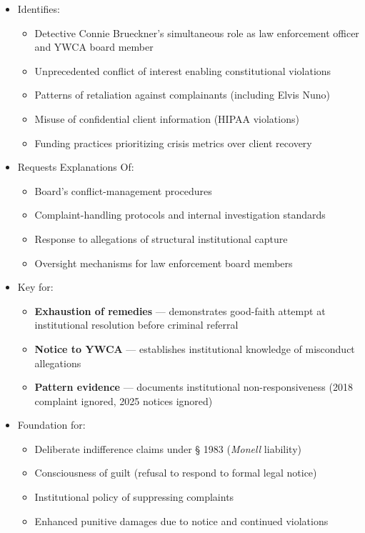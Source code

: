 \documentclass[11pt, letterpaper]{article}
\begin{document}
\begin{itemize}[leftmargin=*]
  \item Identifies:
    \begin{itemize}
      \item Detective Connie Brueckner's simultaneous role as law enforcement officer and YWCA board member
      \item Unprecedented conflict of interest enabling constitutional violations
      \item Patterns of retaliation against complainants (including Elvis Nuno)
      \item Misuse of confidential client information (HIPAA violations)
      \item Funding practices prioritizing crisis metrics over client recovery
    \end{itemize}
  \item Requests Explanations Of:
    \begin{itemize}
      \item Board's conflict-management procedures
      \item Complaint-handling protocols and internal investigation standards
      \item Response to allegations of structural institutional capture
      \item Oversight mechanisms for law enforcement board members
    \end{itemize}
  \item Key for:
    \begin{itemize}
      \item \textbf{Exhaustion of remedies} --- demonstrates good-faith attempt at institutional resolution before criminal referral
      \item \textbf{Notice to YWCA} --- establishes institutional knowledge of misconduct allegations
      \item \textbf{Pattern evidence} --- documents institutional non-responsiveness (2018 complaint ignored, 2025 notices ignored)
    \end{itemize}
  \item Foundation for:
    \begin{itemize}
      \item Deliberate indifference claims under \S{} 1983 (\textit{Monell} liability)
      \item Consciousness of guilt (refusal to respond to formal legal notice)
      \item Institutional policy of suppressing complaints
      \item Enhanced punitive damages due to notice and continued violations
    \end{itemize}
\end{itemize}
\end{document}
